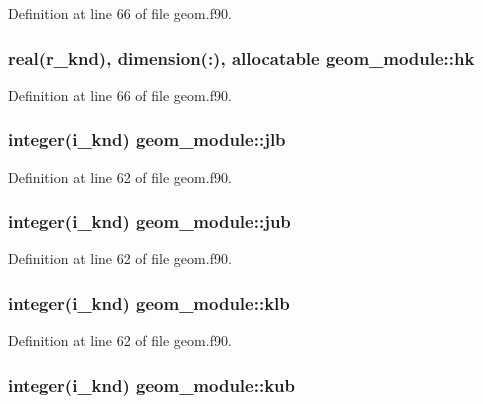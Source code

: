 Definition at line 66 of file geom.\-f90.

\hypertarget{classgeom__module_a42bd1a5bffae9b223ac63ce018664023}{
\subsubsection[{hk}]{\setlength{\rightskip}{0pt plus 5cm}real(r\-\_\-knd), dimension(\-:), allocatable geom\-\_\-module\-::hk}}\label{classgeom__module_a42bd1a5bffae9b223ac63ce018664023}


Definition at line 66 of file geom.\-f90.

\hypertarget{classgeom__module_a87c8f8859d2d98c1dfc36f0ccf4208df}{
\subsubsection[{jlb}]{\setlength{\rightskip}{0pt plus 5cm}integer(i\-\_\-knd) geom\-\_\-module\-::jlb}}\label{classgeom__module_a87c8f8859d2d98c1dfc36f0ccf4208df}


Definition at line 62 of file geom.\-f90.

\hypertarget{classgeom__module_ada7a9e753e21b30a06f0858f5deb4300}{
\subsubsection[{jub}]{\setlength{\rightskip}{0pt plus 5cm}integer(i\-\_\-knd) geom\-\_\-module\-::jub}}\label{classgeom__module_ada7a9e753e21b30a06f0858f5deb4300}


Definition at line 62 of file geom.\-f90.

\hypertarget{classgeom__module_a7c3abb8b57ed30570288a1da71db8444}{
\subsubsection[{klb}]{\setlength{\rightskip}{0pt plus 5cm}integer(i\-\_\-knd) geom\-\_\-module\-::klb}}\label{classgeom__module_a7c3abb8b57ed30570288a1da71db8444}


Definition at line 62 of file geom.\-f90.

\hypertarget{classgeom__module_a79842b1abc678e999d926bc361620371}{
\subsubsection[{kub}]{\setlength{\rightskip}{0pt plus 5cm}integer(i\-\_\-knd) geom\-\_\-module\-::kub}}\label{classgeom__module_a79842b1abc678e999d926bc361620371}


